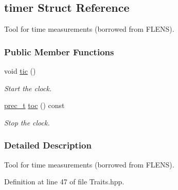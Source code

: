 \hypertarget{structtimer}{
\subsection{timer Struct Reference}
\label{structtimer}
}
Tool for time measurements (borrowed from FLENS).  


\subsubsection*{Public Member Functions}
\begin{CompactItemize}
\item 
\hypertarget{structtimer_ab27b8440617209d519b460bb73e81cf}{
void \hyperlink{structtimer_ab27b8440617209d519b460bb73e81cf}{tic} ()}
\label{structtimer_ab27b8440617209d519b460bb73e81cf}

\begin{CompactList}\small\item\em Start the clock. \item\end{CompactList}\item 
\hypertarget{structtimer_d6e7d999c03a660f0ba4b4e75535ddab}{
\hyperlink{Traits_8hpp_81f62fadeebafe942380746e380c72a5}{prec\_\-t} \hyperlink{structtimer_d6e7d999c03a660f0ba4b4e75535ddab}{toc} () const }
\label{structtimer_d6e7d999c03a660f0ba4b4e75535ddab}

\begin{CompactList}\small\item\em Stop the clock. \item\end{CompactList}\end{CompactItemize}


\subsubsection{Detailed Description}
Tool for time measurements (borrowed from FLENS). 

Definition at line 47 of file Traits.hpp.